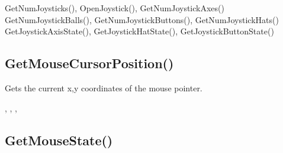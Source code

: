 \documentclass[letterpaper,10pt,english]{sphinxmanual}
\begin{document}
\sphinxAtStartPar
{}

\sphinxAtStartPar
GetNumJoysticks(), OpenJoystick(), GetNumJoystickAxes() GetNumJoystickBalls(), GetNumJoystickButtons(), GetNumJoystickHats() GetJoystickAxisState(), GetJoystickHatState(), GetJoystickButtonState()

\ignorespaces 

\subsection{GetMouseCursorPosition()}
\label{\detokenize{reference/peblenvironment:getmousecursorposition}}\label{\detokenize{reference/peblenvironment:index-16}}
\sphinxAtStartPar
{}

\sphinxAtStartPar
Gets the current x,y coordinates of the mouse   pointer.

\sphinxAtStartPar
{}

\begin{sphinxVerbatim}[commandchars=\\\{\}]
\end{sphinxVerbatim}

\sphinxAtStartPar
{}

\begin{sphinxVerbatim}[commandchars=\\\{\}]
\end{sphinxVerbatim}

\sphinxAtStartPar
{}

\sphinxAtStartPar
{}, ,   , 

\ignorespaces 

\subsection{GetMouseState()}
\label{\detokenize{reference/peblenvironment:getmousestate}}\label{\detokenize{reference/peblenvironment:index-17}}
\sphinxAtStartPar
{}
\end{document}
